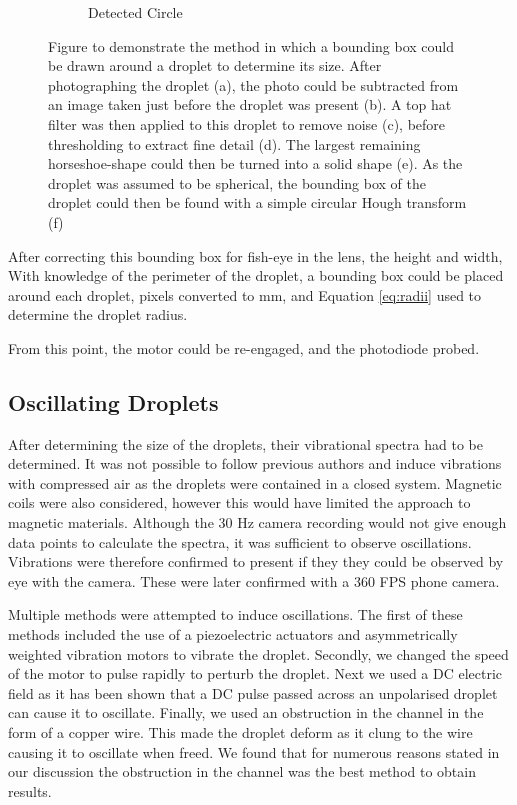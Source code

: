 \documentclass{physics_article_B}
\begin{document}
\begin{figure}[H]
\begin{subfigure}[b]{0.3\textwidth}
                        \caption{Detected Circle}
                        \label{fig:size:6}
                    \end{subfigure}
                    \caption{Figure to demonstrate the method in which a bounding box could be drawn around a droplet to determine its size. After photographing the droplet (a), the photo could be subtracted from an image taken just before the droplet was present (b). A top hat filter was then applied to this droplet to remove noise (c), before thresholding to extract fine detail (d). The largest remaining horseshoe-shape could then be turned into a solid shape (e). As the droplet was assumed to be spherical, the bounding box of the droplet could then be found with a simple circular Hough transform (f) }\label{fig:size}
                \end{figure}
            
            After correcting this bounding box for fish-eye in the lens, the height and width, With knowledge of the perimeter of the droplet, a bounding box could be placed around each droplet, pixels converted to mm, and Equation \ref{eq:radii} used to determine the droplet radius.
            
            From this point, the motor could be re-engaged, and the photodiode probed.
    
    \subsection{Oscillating Droplets\label{sect:method:oscillating}}
        
        After determining the size of the droplets, their vibrational spectra had to be determined. It was not possible to follow previous authors and induce vibrations with compressed air as the droplets were contained in a closed system. Magnetic coils were also considered, however this would have limited the approach to magnetic materials. Although the 30 Hz camera recording would not give enough data points to calculate the spectra, it was sufficient to observe oscillations. Vibrations were therefore confirmed to present if they they could be observed by eye with the camera. These were later confirmed with a 360 FPS phone camera.
        
        Multiple methods were attempted to induce oscillations. The first of these methods included the use of a piezoelectric actuators and asymmetrically weighted vibration motors to vibrate the droplet. Secondly, we changed the speed of the motor to pulse rapidly to perturb the droplet. Next we used a DC electric field as it has been shown that a DC pulse passed across an unpolarised droplet can cause it to oscillate. Finally, we used an obstruction in the channel in the form of a copper wire. This made the droplet deform as it clung to the wire causing it to oscillate when freed. We found that for numerous reasons stated in our discussion the obstruction in the channel was the best method to obtain results.
        
\end{document}
